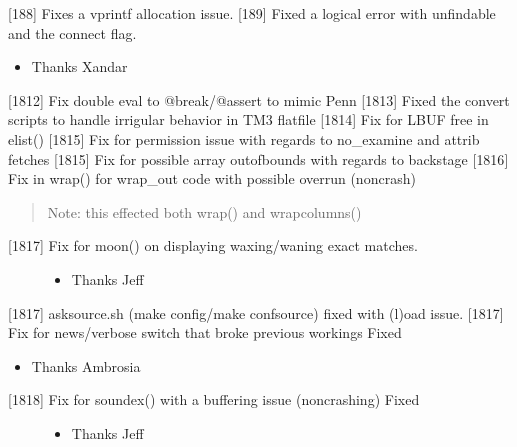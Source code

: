 \documentclass[letterpaper,10pt,english]{sphinxmanual}
\begin{document}
\sphinxAtStartPar
{[}18\sphinxhyphen{}8{]} Fixes a vprintf allocation issue.
{[}18\sphinxhyphen{}9{]} Fixed a logical error with unfindable and the connect flag.
\begin{itemize}
\item {} 
\sphinxAtStartPar
Thanks Xandar

\end{itemize}

\sphinxAtStartPar
{[}18\sphinxhyphen{}12{]} Fix double eval to @break/@assert to mimic Penn
{[}18\sphinxhyphen{}13{]} Fixed the convert scripts to handle irrigular behavior in TM3 flatfile
{[}18\sphinxhyphen{}14{]} Fix for LBUF free in elist()
{[}18\sphinxhyphen{}15{]} Fix for permission issue with regards to no\_examine and attrib fetches
{[}18\sphinxhyphen{}15{]} Fix for possible array out\sphinxhyphen{}of\sphinxhyphen{}bounds with regards to backstage
{[}18\sphinxhyphen{}16{]} Fix in wrap() for wrap\_out code with possible overrun (non\sphinxhyphen{}crash)
\begin{quote}

\sphinxAtStartPar
Note: this effected both wrap() and wrapcolumns()
\end{quote}
\begin{description}
\item[{{[}18\sphinxhyphen{}17{]} Fix for moon() on displaying waxing/waning exact matches.}] \leavevmode\begin{itemize}
\item {} 
\sphinxAtStartPar
Thanks Jeff

\end{itemize}

\end{description}

\sphinxAtStartPar
{[}18\sphinxhyphen{}17{]} asksource.sh (make config/make confsource) fixed with (l)oad issue.
{[}18\sphinxhyphen{}17{]} Fix for news/verbose switch that broke previous workings \sphinxhyphen{} Fixed
\begin{itemize}
\item {} 
\sphinxAtStartPar
Thanks Ambrosia

\end{itemize}
\begin{description}
\item[{{[}18\sphinxhyphen{}18{]} Fix for soundex() with a buffering issue (non\sphinxhyphen{}crashing) \sphinxhyphen{} Fixed}] \leavevmode\begin{itemize}
\item {} 
\sphinxAtStartPar
Thanks Jeff

\end{itemize}

\end{description}
\end{document}
